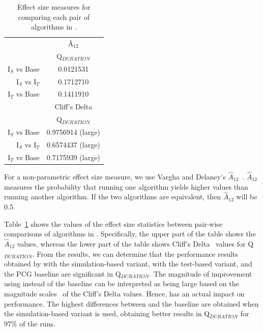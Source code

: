 \begin{table}[H]
\centering
\caption{Effect size measures for comparing each pair of algorithms in \CaseStudy{}.}
\label{tab:effectSize}
\begin{tabular}{@{}rc@{}}
\toprule
               & Â$_{12}$          \\ \cmidrule(l){2-2} 
               & Q$_{DURATION}$    \\ \midrule
I$_S$ vs Base  & 0.0121531         \\
I$_S$ vs I$_T$ & 0.1712710         \\
I$_T$ vs Base  & 0.1411910         \\ \midrule
               & Cliff's Delta     \\ \cmidrule(l){2-2} 
               & Q$_{DURATION}$    \\ \midrule
I$_S$ vs Base  & 0.9756914 (large) \\
I$_S$ vs I$_T$ & 0.6574437 (large) \\
I$_T$ vs Base  & 0.7175939 (large) \\ \bottomrule
\end{tabular}
\end{table}

For a non-parametric effect size measure, we use Vargha and Delaney's $\hat{A}_{12}$~\cite{Vargha2000,Grissom2005}. $\hat{A}_{12}$ measures the probability that running one algorithm yields higher values than running another algorithm. If the two algorithms are equivalent, then $\hat{A}_{12}$ will be 0.5.

Table~\ref{tab:effectSize} shows the values of the effect size statistics between pair-wise comparisons of algorithms in \CaseStudy{}. Specifically, the upper part of the table shows the $\hat{A}_{12}$ values, whereas the lower part of the table shows Cliff's Delta~\cite{Cliff1996} values for Q$_{DURATION}$. From the results, we can determine that the performance results obtained by \ApproachName{} with the simulation-based variant, \ApproachName{} with the test-based variant, and the PCG baseline are significant in Q$_{DURATION}$. The magnitude of improvement using \ApproachName{} instead of the baseline can be interpreted as being large based on the magnitude scales~\cite{Romano2006} of the Cliff's Delta values. Hence, \ApproachName{} has an actual impact on performance. The highest differences between \ApproachName{} and the baseline are obtained when the simulation-based variant is used, obtaining better results in Q$_{DURATION}$ for 97\% of the runs.

